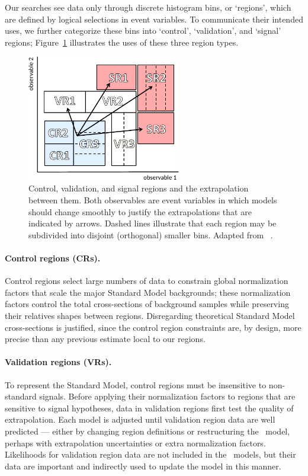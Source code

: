 Our searches see data only through discrete histogram bins,
or `regions', which are defined by logical selections in event variables.
To communicate their intended uses, we further categorize these bins into
`control', `validation', and `signal' regions;
Figure~\ref{fig:searches_histfitter_regions} illustrates the uses of these
three region types.

\begin{figure}[tp]
\centering
\includegraphics[width=0.6\textwidth]{figures/searches_histfitter_regions.pdf}
\caption[
Control, validation, and signal regions
]{%
Control, validation, and signal regions and the extrapolation between them.
Both observables are event variables in which models should change
smoothly to justify the extrapolations that are indicated by arrows.
Dashed lines illustrate that each region may be subdivided into
disjoint (orthogonal) smaller bins.
Adapted from \histfitter~\cite{histfitter2015}.
}
\label{fig:searches_histfitter_regions}
\end{figure}

\paragraph{Control regions (CRs).}
Control regions select large numbers of data to
constrain global normalization factors that scale the major
Standard Model backgrounds;
these normalization factors control the total cross-sections of
background samples while preserving their relatives shapes between regions.
Disregarding theoretical Standard Model cross-sections is justified, since
the control region constraints are, by design, more precise than any previous
estimate local to our regions.

\paragraph{Validation regions (VRs).}
To represent the Standard Model, control regions must be insensitive to
non-standard signals.
Before applying their normalization factors to regions that are sensitive
to signal hypotheses, data in validation regions first
test the quality of extrapolation.
Each model is adjusted until validation region data are well predicted ---
either by changing region definitions or restructuring the \heplikelihood\
model, perhaps with extrapolation uncertainties or extra normalization
factors.
Likelihoods for validation region data are not included in the \heplikelihood\
models, but their data are important and indirectly used to update the
model in this manner.

